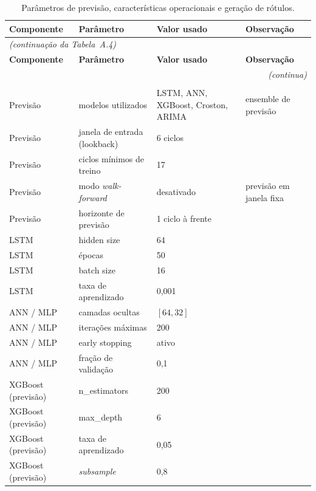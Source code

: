 \begingroup\setlength{\tabcolsep}{4pt}\scriptsize
\begin{longtable}{@{} p{2.6cm} p{5.2cm} p{2.8cm} p{4.0cm} @{}}
\caption[Parâmetros de previsão, características operacionais e geração de rótulos.]{Parâmetros de previsão, características operacionais e geração de rótulos.}
\label{tab:forecast_label_params} \\
\toprule
\textbf{Componente} & \textbf{Parâmetro} & \textbf{Valor usado} & \textbf{Observação} \\
\midrule
\endfirsthead
\multicolumn{4}{l}{\scriptsize\textit{(continuação da Tabela~A.4)}} \\[2pt]
\toprule
\textbf{Componente} & \textbf{Parâmetro} & \textbf{Valor usado} & \textbf{Observação} \\
\midrule
\endhead
\midrule
\multicolumn{4}{r}{\scriptsize\textit{(continua)}} \\
\endfoot
\bottomrule
\endlastfoot

\multicolumn{4}{@{}l}{\textit{Previsão auxiliar}} \\[2pt]
Previsão & modelos utilizados & LSTM, ANN, XGBoost, Croston, ARIMA & ensemble de previsão \\
Previsão & janela de entrada (lookback) & 6 ciclos & \\
Previsão & ciclos mínimos de treino & 17 & \\
Previsão & modo \textit{walk-forward} & desativado & previsão em janela fixa \\
Previsão & horizonte de previsão & 1 ciclo à frente & \\[3pt]

LSTM & hidden size & 64 & \\
LSTM & épocas & 50 & \\
LSTM & batch size & 16 & \\
LSTM & taxa de aprendizado & 0,001 & \\[3pt]

ANN / MLP & camadas ocultas & $[64, 32]$ & \\
ANN / MLP & iterações máximas & 200 & \\
ANN / MLP & early stopping & ativo & \\
ANN / MLP & fração de validação & 0,1 & \\[3pt]

XGBoost (previsão) & n\_estimators & 200 & \\
XGBoost (previsão) & max\_depth & 6 & \\
XGBoost (previsão) & taxa de aprendizado & 0,05 & \\
XGBoost (previsão) & \textit{subsample} & 0,8 & \\[3pt]


\end{longtable}
